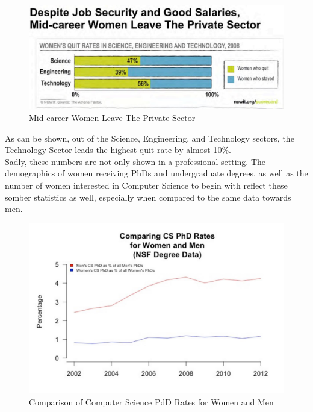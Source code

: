 \documentclass[12pt]{article}
\begin{document}
	 	\begin{figure}[H]
	 		\begin{center}
	 			\includegraphics[width = \textwidth, keepaspectratio]{leavingSector}
	 			\caption{Mid-career Women Leave The Private Sector}
	 		\end{center}
	 	\end{figure}	
	
	As can be shown, out of the Science, Engineering, and Technology sectors, the Technology Sector leads the highest quit rate by almost 10\%.\\
	
	Sadly, these numbers are not only shown in a professional setting. The demographics of women receiving PhDs and undergraduate degrees, as well as the number of women interested in Computer Science to begin with reflect these somber statistics as well, especially when compared to the same data towards men. \\

	 	\begin{figure}[H]
	 		\begin{center}
	 			\includegraphics[width = \textwidth, keepaspectratio]{phdRates}
	 			\caption{Comparison of Computer Science PdD Rates for Women and Men}
	 		\end{center}
	 	\end{figure}
	
\end{document}

